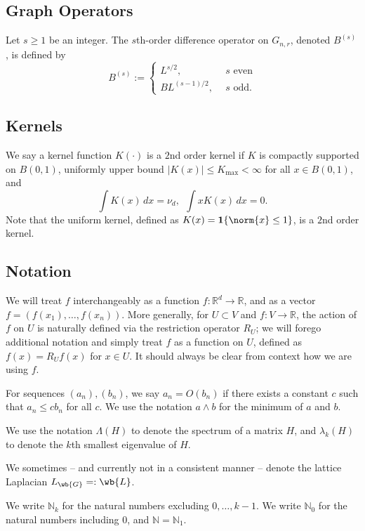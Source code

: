 \documentclass{article}
\newcommand{\Reals}{\mathbb{R}}
\newcommand{\abs}[1]{\left \lvert #1 \right \rvert}
\newcommand{\1}{\mathbf{1}}
\newcommand{\Rd}{\Reals^d}
\theoremstyle{alden}
\theoremstyle{aldenthm}
\theoremstyle{definition}
\theoremstyle{remark}
\begin{document}
\subsection{Graph Operators}
Let $s \geq 1$ be an integer. The $s$th-order difference operator on $G_{n,r}$, denoted $B^{(s)}$, is defined by
\begin{equation*}
B^{(s)} :=
\begin{cases}
L^{s/2},& ~~ s \textrm{ even} \\
BL^{(s - 1)/2},& ~~ s \textrm{ odd.}
\end{cases}
\end{equation*}

\subsection{Kernels}
We say a kernel function $K(\cdot)$ is a $2$nd order kernel if $K$ is compactly supported on $B(0,1)$, uniformly upper bound $\abs{K(x)} \leq K_{\max} < \infty$ for all $x \in B(0,1)$, and
\begin{equation*}
\int K(x) \,dx = \nu_d,~~ \int x K(x) \,dx = 0.
\end{equation*}
Note that the uniform kernel, defined as $K(x) = \1\{\norm{x} \leq 1\}$, is a $2$nd order kernel. 

\subsection{Notation}

We will treat $f$ interchangeably as a function $f:\Rd \to \Reals$, and as a vector $f = (f(x_1),\ldots,f(x_n))$. More generally, for $U \subset V$ and $f:V \to \Reals$, the action of $f$ on $U$ is naturally defined via the restriction operator $R_U$; we will forego additional notation and simply treat $f$ as a function on $U$, defined as $f(x) = R_Uf(x)$ for $x \in U$. It should always be clear from context how we are using $f$. 

For sequences $(a_n), (b_n)$, we say $a_n = O(b_n)$ if there exists a constant $c$ such that $a_n \leq cb_n$ for all $c$. We use the notation $a \wedge b$ for the minimum of $a$ and $b$.

We use the notation $\Lambda(H)$ to denote the spectrum of a matrix $H$, and $\lambda_k(H)$ to denote the $k$th smallest eigenvalue of $H$.

We sometimes -- and currently not in a consistent manner -- denote the lattice Laplacian $L_{\wb{G}} =: \wb{L}$. 

We write $\mathbb{N}_k$ for the natural numbers excluding $0,\ldots,k - 1$. We write $\mathbb{N}_0$ for the natural numbers including $0$, and $\mathbb{N} = \mathbb{N}_1$.
\end{document}
